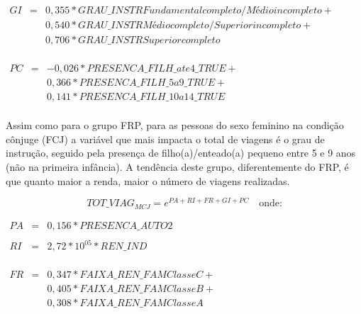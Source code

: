 \begin{math}
\begin{array} {rcl}
GI & = & 0,355*GRAU\_INSTRFundamental completo / Médio incompleto + \\
   &   & 0,540*GRAU\_INSTRMédio completo / Superior incompleto + \\
   &   & 0,706*GRAU\_INSTRSuperior completo \\  
\end{array}
\end{math}

\begin{math}
\begin{array} {rcl}
PC & = & -0,026*PRESENCA\_FILH\_ate4\_TRUE + \\
   &   & 0,366*PRESENCA\_FILH\_5a9\_TRUE +\\
   &   & 0,141*PRESENCA\_FILH\_10a14\_TRUE \\  
\end{array}
\end{math}

Assim como para o grupo FRP, para as pessoas do sexo feminino na condição cônjuge (FCJ) a variável que mais impacta o total de viagens é o grau de instrução, seguido pela presença de filho(a)/enteado(a) pequeno entre 5 e 9 anos (não na primeira infância).
A tendência deste grupo, diferentemente do FRP, é que quanto maior a renda, maior o número de viagens realizadas.

\begin{equation}\label{eq:quasi-poisson-GD} 
TOT\_VIAG _{MCJ}= e^{PA + RI + FR + GI + PC}
\quad \text{onde:}
\end{equation}

\begin{math}
\begin{array} {rcl}
PA & = & 0,156*PRESENCA\_AUTO2 \\  
   &   & \\
RI & = & 2,72*10^{05}*REN\_IND \\  
\end{array}
\end{math}

\begin{math}
\begin{array} {rcl}
FR & = & 0,347*FAIXA\_REN\_FAMClasse C + \\
   &   & 0,405*FAIXA\_REN\_FAMClasse B + \\      
   &   & 0,308*FAIXA\_REN\_FAMClasse A \\
\end{array}
\end{math}

